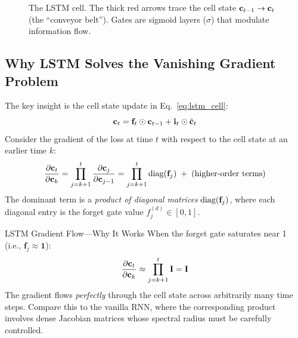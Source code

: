 \begin{figure}[H]
\caption{The LSTM cell.  The thick red arrows trace the cell state
$\mathbf{c}_{t-1} \to \mathbf{c}_t$ (the ``conveyor belt'').  Gates are sigmoid layers
($\sigma$) that modulate information flow.}
\label{fig:lstm_cell}
\end{figure}

\subsection{Why LSTM Solves the Vanishing Gradient Problem}

The key insight is the cell state update in Eq.~\eqref{eq:lstm_cell}:
\begin{equation}
\mathbf{c}_t = \mathbf{f}_t \odot \mathbf{c}_{t-1} + \mathbf{i}_t \odot \tilde{\mathbf{c}}_t
\end{equation}
Consider the gradient of the loss at time $t$ with respect to the cell state
at an earlier time $k$:
\begin{equation}
\frac{\partial \mathbf{c}_t}{\partial \mathbf{c}_k}
= \prod_{j=k+1}^{t} \frac{\partial \mathbf{c}_j}{\partial \mathbf{c}_{j-1}}
= \prod_{j=k+1}^{t} \operatorname{diag}(\mathbf{f}_j)
  \;+\; \text{(higher-order terms)}
\label{eq:lstm_gradient}
\end{equation}
The dominant term is a \emph{product of diagonal matrices}
$\operatorname{diag}(\mathbf{f}_j)$, where each diagonal entry is the forget gate value
$f_j^{(d)} \in [0, 1]$.

\begin{mathresult}{LSTM Gradient Flow---Why It Works}
When the forget gate saturates near 1 (i.e., $\mathbf{f}_j \approx \mathbf{1}$):
\begin{equation}
\frac{\partial \mathbf{c}_t}{\partial \mathbf{c}_k}
\approx \prod_{j=k+1}^{t} \mathbf{I} = \mathbf{I}
\end{equation}
The gradient flows \emph{perfectly} through the cell state across
arbitrarily many time steps.  Compare this to the vanilla RNN, where the
corresponding product involves dense Jacobian matrices whose spectral
radius must be carefully controlled.
\end{mathresult}

